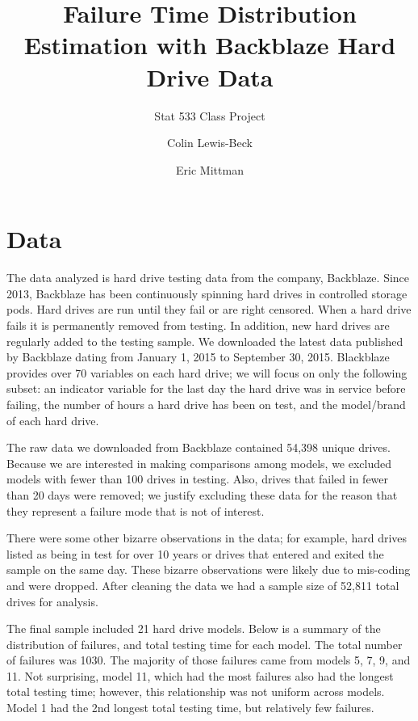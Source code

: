 \documentclass{scrartcl}
\title{Failure Time Distribution Estimation with Backblaze Hard Drive Data}
\subtitle{Stat 533 Class Project}
\author{Colin Lewis-Beck\\
  \and
  Eric Mittman}
\begin{document}
\noindent
\maketitle
\section*{Data}
The data analyzed is hard drive testing data from the company, Backblaze\cite{backblaze}.  Since 2013, Backblaze has been continuously spinning hard drives in controlled storage pods.  Hard drives are run until they fail or are right censored.  When a hard drive fails it is permanently removed from testing.  In addition, new hard drives are regularly added to the testing sample.  We downloaded the latest data published by Backblaze dating from January 1, 2015 to September 30, 2015.  Blackblaze provides over 70 variables on each hard drive; we will focus on only the following subset: an indicator variable for the last day the hard drive was in service before failing, the number of hours a hard drive has been on test, and the model/brand of each hard drive.

The raw data we downloaded from Backblaze contained 54,398 unique drives.  Because we are interested in making comparisons among models, we excluded models with fewer than 100 drives in testing.  Also, drives that failed in fewer than 20 days were removed; we justify excluding these data for the reason that they represent a failure mode that is not of interest.

There were some other bizarre observations in the data; for example, hard drives listed as being in test for over 10 years or drives that entered and exited the sample on the same day.  These bizarre observations were likely due to mis-coding and were dropped.  After cleaning the data we had a sample size of 52,811 total drives for analysis.

The final sample included 21 hard drive models.  Below is a summary of the distribution of failures, and total testing time for each model.  The total number of failures was 1030.  The majority of those failures came from models 5, 7, 9, and 11.  Not surprising, model 11, which had the most failures also had the longest total testing time; however, this relationship was not uniform across models.  Model 1 had the 2nd longest total testing time, but relatively few failures.
\end{document}
